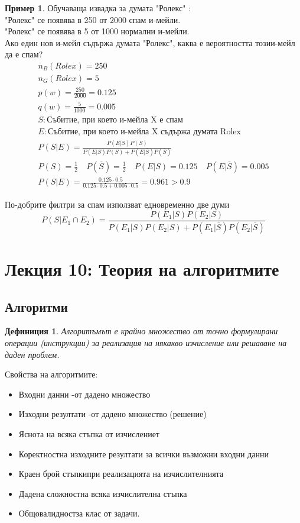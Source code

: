 \documentclass[fleqn, 12pt]{article}
\newtheorem{definition}{Дефиниция}[subsection]
\theoremstyle{definition}
\newtheorem{example}{Пример}[subsection]
\begin{document}
\begin{example}
Обучаваща извадка за думата "Ролекс" :\\
"Ролекс" се появява в 250 от 2000 спам и-мейли. \\
"Ролекс" се появява в 5 от 1000 нормални и-мейли.\\
Ако един нов и-мейл съдържа думата "Ролекс", каква е вероятността тозии-мейл да е спам?
\begin{gather*}
n_B (Rolex) = 250 \\
n_G(Rolex) = 5 \\
p(w) = \frac{250}{2000} = 0.125 \\
q(w) = \frac{5}{1000} = 0.005 \\
S: \text{Събитие, при което и-мейла X е спам}\\
E: \text{Събитие, при което и-мейла X съдържа думата Rolex} \\
P(S|E) = \frac{P(E|S)P(S)}{P(E|S)P(S) + P(E|\overline{S})P(\overline{S})}\\
P(S) = \frac{1}{2} \quad P(\overline{S}) = \frac{1}{2} \quad P(E|S) = 0.125 \quad P(E|\overline{S}) = 0.005 \\
P(S|E) = \frac{0.125 \cdot 0.5}{0.125 \cdot 0.5 + 0.005\cdot 0.5}= 0.961 > 0.9
\end{gather*}
\end{example}
По-добрите филтри за спам използват едновременно две думи
$$P(S|E_1 \cap E_2) = \frac{P(E_1|S)P(E_2|S)}{P(E_1|S)P(E_2|S) + P(E_1|\overline{S})P(E_2|\overline{S})}$$

\newpage
\section{Лекция 10: Теория на алгоритмите}

\subsection{Алгоритми}
\begin{definition}
Алгоритъмът е крайно множество от точно формулирани операции (инструкции) за реализация на някакво изчисление или решаване на даден проблем. 
\end{definition}
Свойства на алгоритмите:
\begin{itemize}
\item Входни данни -от дадено множество
\item Изходни резултати -от дадено множество (решение)
\item Яснота на всяка стъпка от изчислениет
\item Коректностна изходните резултати за всички възможни входни данни
\item Краен брой стъпкипри реализацията на изчислителнията
\item Дадена сложностна всяка изчислителна стъпка
\item Общовалидностза клас от задачи.
\end{itemize}
\end{document}
